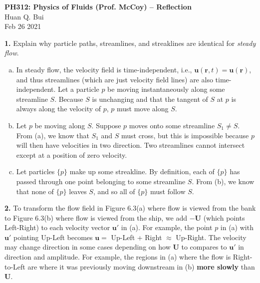 \documentclass[11pt]{article}
\begin{document}
\begin{center}
{\large \bf PH312: Physics of Fluids (Prof. McCoy) -- Reflection}\\
{ Huan Q. Bui}\\
Feb 26 2021
\end{center}

\noindent \textbf{1.} Explain why particle paths, streamlines, and streaklines are identical for \textit{steady flow}.
\begin{enumerate}[(a)]
	\item In steady flow, the velocity field is  time-independent, i.e., $\mathbf{u}(\mathbf{r},t) = \mathbf{u}(\mathbf{r})$, and thus streamlines (which are just velocity field lines) are also time-independent. Let a particle $p$ be moving instantaneously along some streamline $S$. Because $S$ is unchanging and that the tangent of $S$ at $p$ is always along the velocity of $p$, $p$ must move along $S$.   
	
	\item Let $p$ be moving along $S$. Suppose $p$ moves onto some streamline $S_1 \neq S$. From (a), we know that $S_1$ and $S$ must cross, but this is impossible because $p$ will then have velocities in two direction. Two streamlines cannot intersect except at a position of zero velocity.
	
	\item Let particles $\{p\}$ make up some streakline. By definition, each of $\{p\}$ has passed through one point belonging to some streamline $S$. From (b), we know that none of $\{p\}$ leaves $S$, and so all of $\{p\}$ must follow $S$. 
\end{enumerate}

  
  
  
\noindent \textbf{2.} To transform the flow field in Figure 6.3(a) where flow is viewed from the bank to Figure 6.3(b) where flow is viewed from the ship, we add $-\mathbf{U}$ (which points Left-Right) to each velocity vector $\mathbf{u}'$ in (a). For example, the point $p$ in (a) with $\mathbf{u}'$ pointing Up-Left becomes $\mathbf{u} = $ Up-Left + Right $\approx$ Up-Right. The velocity may change direction in some cases depending on how $\mathbf{U}$ to compares to $\mathbf{u}'$ in direction and amplitude. For example, the regions in (a) where the flow is Right-to-Left are where it was previously moving downstream in (b) \textbf{more slowly} than $\mathbf{U}$.  \\
\end{document}
